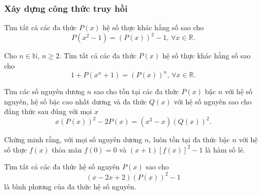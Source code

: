 \subsubsection{Xây dựng công thức truy hồi}
	\begin{vd}Tìm tất cả các đa thức $P(x)$ hệ số thực khác hằng số sao cho $$P(x^2-1)=\left(P(x)\right)^2-1,\,\forall x\in\mathbb{R}.$$
 \end{vd}
\begin{bt}
	Cho $n\in\mathbb{N}$, $n\geq 2$. Tìm tất cả các đa thức $P(x)$ hệ số thực khác hằng số sao cho $$1+P(x^n+1)=(P(x))^n, \, \forall x\in\mathbb{R}.$$
\end{bt}
\begin{bt}
	Tìm các số nguyên dương $n$ sao cho tồn tại các đa thức $P(x)$ bậc $n$ với hệ số nguyên, hệ số bặc cao nhất dương và đa thức $Q(x)$ với hệ số nguyên sao cho đẳng thức sau đúng với mọi $x$ $$x\left(P(x)\right)^2-2P(x)=\left(x^3-x\right)\left(Q(x)\right)^2.$$
\end{bt}
\begin{bt}
	Chứng minh rằng, với mọi số nguyên dương $n$, luôn tồn tại đa thức bậc $n$ với hệ số thực $f(x)$ thỏa mãn $f(0)=0$ và $(x+1)\left[f(x)\right]^2-1$ là hàm số lẻ.
\end{bt}
\begin{bt}
	Tìm tất cả các đa thức hệ số nguyên $P(x)$ sao cho $$\left(x-2x+2\right)\left(P(x)\right)^2-1$$ là bình phương của đa thức hệ số nguyên. 
\end{bt}
